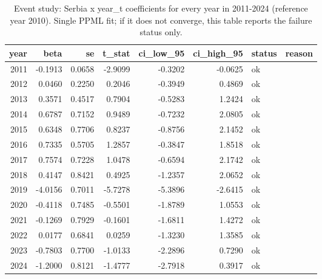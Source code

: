 \begin{table}
\caption{Event study: Serbia x year\_t coefficients for every year in 2011-2024 (reference year 2010). Single PPML fit; if it does not converge, this table reports the failure status only.}
\label{tbl:ch5-event-study}
\begin{tabular}{rrrrrrll}
\toprule
year & beta & se & t\_stat & ci\_low\_95 & ci\_high\_95 & status & reason \\
\midrule
2011 & -0.1913 & 0.0658 & -2.9099 & -0.3202 & -0.0625 & ok &  \\
2012 & 0.0460 & 0.2250 & 0.2046 & -0.3949 & 0.4869 & ok &  \\
2013 & 0.3571 & 0.4517 & 0.7904 & -0.5283 & 1.2424 & ok &  \\
2014 & 0.6787 & 0.7152 & 0.9489 & -0.7232 & 2.0805 & ok &  \\
2015 & 0.6348 & 0.7706 & 0.8237 & -0.8756 & 2.1452 & ok &  \\
2016 & 0.7335 & 0.5705 & 1.2857 & -0.3847 & 1.8518 & ok &  \\
2017 & 0.7574 & 0.7228 & 1.0478 & -0.6594 & 2.1742 & ok &  \\
2018 & 0.4147 & 0.8421 & 0.4925 & -1.2357 & 2.0652 & ok &  \\
2019 & -4.0156 & 0.7011 & -5.7278 & -5.3896 & -2.6415 & ok &  \\
2020 & -0.4118 & 0.7485 & -0.5501 & -1.8789 & 1.0553 & ok &  \\
2021 & -0.1269 & 0.7929 & -0.1601 & -1.6811 & 1.4272 & ok &  \\
2022 & 0.0177 & 0.6841 & 0.0259 & -1.3230 & 1.3585 & ok &  \\
2023 & -0.7803 & 0.7700 & -1.0133 & -2.2896 & 0.7290 & ok &  \\
2024 & -1.2000 & 0.8121 & -1.4777 & -2.7918 & 0.3917 & ok &  \\
\bottomrule
\end{tabular}
\end{table}
